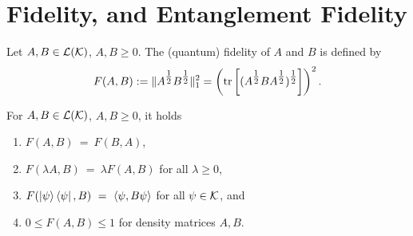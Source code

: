 \section{Fidelity, and Entanglement Fidelity} \label{section:fidelity} 
\begin{definition} \label{def:fidelity}
 Let $A,B \in {\mathcal L}({\mathcal K})$, $A,B \geq 0$. The (quantum) fidelity of $A$ and $B$ is defined by
 \begin{align*} 
  F(A,B) := \|A^{\tfrac{1}{2}} B^{\tfrac{1}{2}} \|_1^2 = \left(\mathrm{tr} \left[ ( A^{\tfrac{1}{2}} B A^{\tfrac{1}{2}})^{\tfrac{1}{2}}\right]\right)^2. 
 \end{align*}
\end{definition}

\begin{lemma} \label{lemma:fidelity_properties}
 For $A,B \in {\mathcal L}({\mathcal K})$, $A, B \geq 0$, it holds
 \begin{enumerate}
  \item $F(A,B) \ = \ F(B,A)$, 
  \item $F(\lambda A, B) \ = \ \lambda F(A, B)$ for all $\lambda \geq 0$,
  \item $F( \ket{\psi}\bra{\psi}, B) \ = \ \braket{\psi, B \psi}$ for all $\psi \in {\mathcal K}$, and 
  \item $0 \leq F(A,B) \leq 1$ for density matrices $A,B$.
  \end{enumerate}
\end{lemma}

